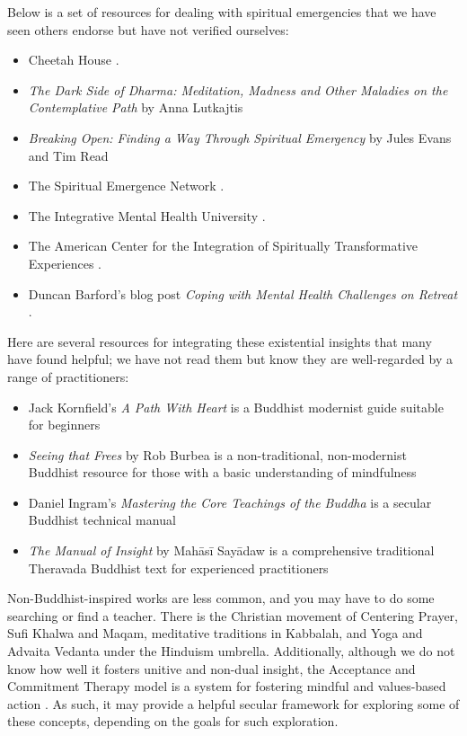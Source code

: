 \documentclass[12pt,letterpaper]{book}
\begin{document}
Below is a set of resources for dealing with spiritual emergencies that we have seen others endorse but have not verified ourselves:
\begin{itemize}
    \item Cheetah House \cite{cheetahHouse}.
    \item \textit{The Dark Side of Dharma: Meditation, Madness and Other Maladies on the Contemplative Path} by Anna Lutkajtis \cite{lutkajtis2021dark}
    \item \textit{Breaking Open: Finding a Way Through Spiritual Emergency} by Jules Evans and Tim Read \cite{evans2020}
    \item The Spiritual Emergence Network \cite{sen}.
    \item The Integrative Mental Health University \cite{imhu}.
    \item The American Center for the Integration of Spiritually Transformative Experiences \cite{aciste}.
    \item Duncan Barford's blog post \textit{Coping with Mental Health Challenges on Retreat} \cite{fireKasinaChallenges}.
\end{itemize}

Here are several resources for integrating these existential insights that many have found helpful; we have not read them but know they are well-regarded by a range of practitioners:
\begin{itemize}
    \item Jack Kornfield's \textit{A Path With Heart} is a Buddhist modernist guide suitable for beginners \cite{kornfield1993path}
    \item \textit{Seeing that Frees} by Rob Burbea is a non-traditional, non-modernist Buddhist resource for those with a basic understanding of mindfulness \cite{burbea2014seeing}
    \item Daniel Ingram's \textit{Mastering the Core Teachings of the Buddha} is a secular Buddhist technical manual \cite{ingram2018mastering}
    \item \textit{The Manual of Insight} by Mahāsī Sayādaw is a comprehensive traditional Theravada Buddhist text for experienced practitioners \cite{sayadaw2016manual}
\end{itemize}
Non-Buddhist-inspired works are less common, and you may have to do some searching or find a teacher. There is the Christian movement of Centering Prayer, Sufi Khalwa and Maqam, meditative traditions in Kabbalah, and Yoga and Advaita Vedanta under the Hinduism umbrella. Additionally, although we do not know how well it fosters unitive and non-dual insight, the Acceptance and Commitment Therapy model is a system for fostering mindful and values-based action \cite{actSimple}. As such, it may provide a helpful secular framework for exploring some of these concepts, depending on the goals for such exploration.
\end{document}
